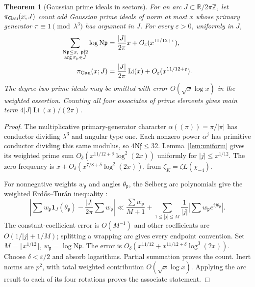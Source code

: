 \documentclass[11pt,a4paper]{article}
\numberwithin{equation}{section}
\newtheorem{theorem}{Theorem}[section]
\theoremstyle{definition}
\theoremstyle{remark}
\newcommand{\R}{\mathbb R}
\newcommand{\Z}{\mathbb Z}
\newcommand{\N}{\mathrm N}
\newcommand{\ind}{\mathbf1}
\newcommand{\eps}{\varepsilon}
\DeclareMathOperator{\Li}{Li}
\begin{document}
\begin{theorem}[Gaussian prime ideals in sectors]\label{thm:sectors}
For an arc $J\subset\R/2\pi\Z$, let $\pi_{\rm Gau}(x;J)$ count odd Gaussian prime ideals of norm at most $x$ whose primary generator $\pi\equiv1\pmod{\lambda^3}$ has argument in $J$. For every $\eps>0$, uniformly in $J$,
\begin{align}\label{eq:sectors}
 \sum_{\substack{\N\mathfrak p\le x,\ \mathfrak p\nmid2\\
                    \arg\pi_{\mathfrak p}\in J}}\log\N\mathfrak p
 &=\frac{|J|}{2\pi}x+O_\eps(x^{11/12+\eps}),\notag\\
 \pi_{\rm Gau}(x;J)&=\frac{|J|}{2\pi}\Li(x)+O_\eps(x^{11/12+\eps}).
\end{align}
The degree-two prime ideals may be omitted with error $O(\sqrt x\log x)$ in the weighted assertion. Counting all four associates of prime elements gives main term $4|J|\Li(x)/(2\pi)$.
\end{theorem}
\begin{proof}
The multiplicative primary-generator character
$\alpha((\pi))=\pi/|\pi|$ has conductor dividing $\lambda^3$ and angular type one. Each nonzero power $\alpha^j$ has primitive conductor dividing this same modulus, so $4\N\mathfrak f\le32$. Lemma~\ref{lem:uniform} gives its weighted prime sum
$O_\delta(x^{11/12+\delta}\log^2(2x))$ uniformly for $|j|\le x^{1/12}$. The zero frequency is $x+O_\delta(x^{7/8+\delta}\log^2(2x))$, from $\zeta_K=\zeta L(\chi_{-4})$.

For nonnegative weights $w_{\mathfrak p}$ and angles $\theta_{\mathfrak p}$, the Selberg arc polynomials give the weighted Erd\H{o}s--Tur\'an inequality \cite[Lemma 2.1 and its proof]{PT}:
\[
 \left|\sum w_{\mathfrak p}\ind_J(\theta_{\mathfrak p})
 -\frac{|J|}{2\pi}\sum w_{\mathfrak p}\right|
 \ll\frac{\sum w_{\mathfrak p}}{M+1}
 +\sum_{1\le|j|\le M}\frac1{|j|}
             \left|\sum w_{\mathfrak p}e^{ij\theta_{\mathfrak p}}\right|.
\]
The constant-coefficient error is $O(M^{-1})$ and other coefficients are $O(1/|j|+1/M)$; splitting a wrapping arc gives every endpoint convention. Set $M=\lfloor x^{1/12}\rfloor$, $w_{\mathfrak p}=\log\N\mathfrak p$. The error is
$O_\delta(x^{11/12}+x^{11/12+\delta}\log^3(2x))$.
Choose $\delta<\eps/2$ and absorb logarithms. Partial summation proves the count. Inert norms are $p^2$, with total weighted contribution $O(\sqrt x\log x)$. Applying the arc result to each of its four rotations proves the associate statement.
\end{proof}
\end{document}
